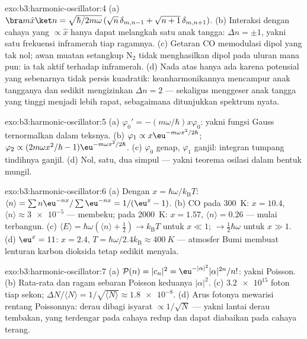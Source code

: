 \begin{solution}{exo:b3:harmonic-oscillator:4}
(a) $\bra m\hat x\ket n = \sqrt{\hbar/2m\omega}\,(\sqrt n\,
\delta_{m,n-1} + \sqrt{n + 1}\,\delta_{m,n+1})$. (b) Interaksi dengan
cahaya yang $\propto\hat x$ hanya dapat melangkah satu anak tangga: $\Delta n =
\pm1$, yakni satu frekuensi inframerah tiap ragamnya. (c)
Getaran CO memodulasi dipol yang tak nol; awan muatan setangkup N$_2$
tidak menghasilkan dipol pada uluran mana pun: ia tak aktif terhadap
inframerah. (d) Nada atas hanya ada karena potensial yang sebenarnya
tidak persis kuadratik: keanharmonikannya mencampur anak tangganya dan
sedikit mengizinkan $\Delta n = 2$ --- sekaligus menggeser anak tangga
yang tinggi menjadi lebih rapat, sebagaimana ditunjukkan spektrum nyata.
\end{solution}

\begin{solution}{exo:b3:harmonic-oscillator:5}
(a) $\varphi_0' = -(m\omega/\hbar)x\varphi_0$: yakni fungsi Gauss
ternormalkan dalam teksnya. (b) $\varphi_1 \propto x\eu^{-m\omega
x^2/2\hbar}$; $\varphi_2 \propto (2m\omega x^2/\hbar -
1)\eu^{-m\omega x^2/2\hbar}$. (c) $\varphi_0$ genap, $\varphi_1$ ganjil:
integran tumpang tindihnya ganjil. (d) Nol, satu, dua simpul --- yakni
teorema osilasi dalam bentuk mungil.
\end{solution}

\begin{solution}{exo:b3:harmonic-oscillator:6}
(a) Dengan $x = \hbar\omega/k_{\text{B}}T$: $\langle n\rangle =
\sum n\eu^{-nx}/\sum\eu^{-nx} = 1/(\eu^x - 1)$. (b) CO pada
\qty{300}{K}: $x = 10.4$, $\langle n\rangle \approx \num{3e-5}$ ---
membeku; pada \qty{2000}{K}: $x = 1.57$, $\langle n\rangle = 0.26$ ---
mulai terbangun. (c) $\langle E\rangle = \hbar\omega(\langle n\rangle +
\tfrac12) \to k_{\text{B}}T$ untuk $x \ll 1$; $\to \tfrac12\hbar
\omega$ untuk $x \gg 1$. (d) $\eu^x = 11$: $x = 2.4$, $T =
\hbar\omega/2.4k_{\text{B}} \approx \qty{400}{K}$ --- atmosfer Bumi
membuat lenturan karbon dioksida tetap sedikit menyala.
\end{solution}

\begin{solution}{exo:b3:harmonic-oscillator:7}
(a) $\mathcal P(n) = |c_n|^2 = \eu^{-|\alpha|^2}|\alpha|^{2n}/n!$:
yakni Poisson. (b) Rata-rata dan ragam sebaran Poisson keduanya
$|\alpha|^2$.
(c) $\num{3.2e15}$ foton tiap sekon; $\Delta N/\langle N\rangle =
1/\sqrt{\langle N\rangle} \approx \num{1.8e-8}$. (d) Arus fotonya
mewarisi rentang Poissonnya: derau dibagi isyarat
$\propto 1/\sqrt N$ --- yakni lantai derau tembakan, yang terdengar pada
cahaya redup dan dapat diabaikan pada cahaya terang.
\end{solution}

